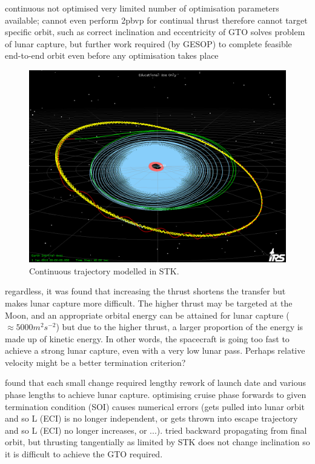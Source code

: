 continuous
not optimised
very limited number of optimisation parameters available; cannot even perform 2pbvp for continual thrust
therefore cannot target specific orbit, such as correct inclination and eccentricity of GTO
solves problem of lunar capture, but further work required (by GESOP) to complete feasible end-to-end orbit even before any optimisation takes place

\begin{figure}
\centering
\includegraphics[width=\textwidth]{Images/STK/trajectory1b.png}
\caption{Continuous trajectory modelled in STK.}
\label{fig:STK}
\end{figure}

regardless, it was found that increasing the thrust shortens the transfer but makes lunar capture more difficult. The higher thrust may be targeted at the Moon, and an appropriate orbital energy can be attained for lunar capture ($\approx5000m^2s^{-2}$) but due to the higher thrust, a larger proportion of the energy is made up of kinetic energy. In other words, the spacecraft is going too fast to achieve a strong lunar capture, even with a very low lunar pass. Perhaps relative velocity might be a better termination criterion?

found that each small change required lengthy rework of launch date and various phase lengths to achieve lunar capture. 
optimising cruise phase forwards to given termination condition (SOI) causes numerical errors (gets pulled into lunar orbit and so L (ECI) is no longer independent, or gets thrown into escape trajectory and so L (ECI) no longer increases, or ...).
tried backward propagating from final orbit, but thrusting tangentially as limited by STK does not change inclination so it is difficult to achieve the GTO required.

